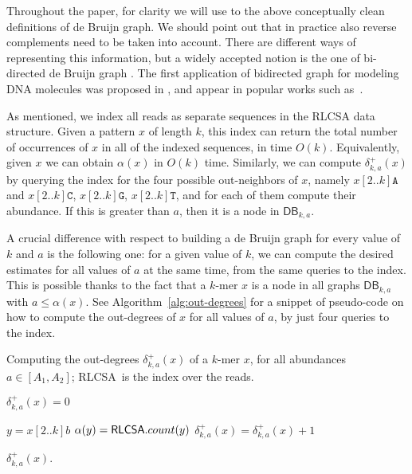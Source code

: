 \documentclass[a4paper,11pt]{article}
\newcommand{\DB}{\mathsf{DB}_{k,a}}
\newcommand{\dplus}{\delta^+_{k,a}}
\newcommand{\abu}{\alpha}
\newcommand{\RLCSA}{{\sf RLCSA}}
\renewcommand{\leq}{\leqslant}
\begin{document}
Throughout the paper, for clarity we will use to the above conceptually clean definitions of de Bruijn graph. We should point out that in practice also reverse complements need to be taken into account. There are different ways of representing this information, but a widely accepted notion is the one of bi-directed de Bruijn graph \cite{DBLP:conf/wabi/MedvedevGMB07}. The first application of bidirected graph for modeling DNA molecules was proposed in \cite{Kececioglu:1992aa}, and appear in popular works such as~\cite{DBLP:journals/bioinformatics/DrezenRCDLPL14}. 

As mentioned, we index all reads as separate sequences in the RLCSA data structure. Given a pattern $x$ of length $k$, this index can return the total number of occurrences of $x$ in all of the indexed sequences, in time $O(k)$. Equivalently, given $x$ we can obtain $\alpha(x)$ in $O(k)$ time. Similarly, we can compute $\dplus(x)$ by querying the index for the four possible out-neighbors of $x$, namely $x[2..k]\mathtt{A}$ and $x[2..k]\mathtt{C}$, $x[2..k]\mathtt{G}$, $x[2..k]\mathtt{T}$, and for each of them compute their abundance. If this is greater than $a$, then it is a node in $\DB$.

A crucial difference with respect to building a de Bruijn graph for every value of $k$ and $a$ is the following one: for a given value of $k$, we can compute the desired estimates for all values of $a$ at the same time, from the same queries to the index. This is possible thanks to the fact that a $k$-mer $x$ is a node in all graphs $\DB$ with $a \leq \abu(x)$. See Algorithm~\ref{alg:out-degrees} for a snippet of pseudo-code on how to compute the out-degrees of $x$ for all values of $a$, by just four queries to the index.

\begin{algorithm}[h]
\caption{Computing the out-degrees $\dplus(x)$ of a $k$-mer $x$, for all abundances $a \in [A_1,A_2]$; \RLCSA\ is the index over the reads.\label{alg:out-degrees}}

{
	$\dplus(x) = 0$\;
}

{
	$y = x[2..k]b$\;
	$\abu(y) = \RLCSA.count(y)$\;
	\For{$a = A_1$ {\rm\bf to} $\min(\abu(y),A_2)$}
	{
		$\dplus(x) = \dplus(x) + 1$\;
	}
}

\Return $\dplus(x)$.
\end{algorithm}
\end{document}
